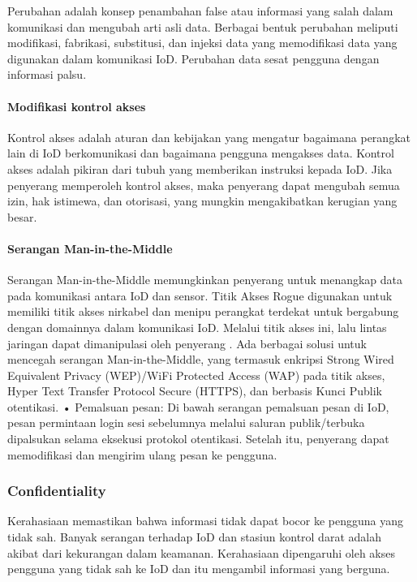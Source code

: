Perubahan adalah konsep penambahan false atau informasi yang salah dalam komunikasi dan mengubah arti asli data. Berbagai bentuk perubahan meliputi modifikasi, fabrikasi, substitusi, dan injeksi data yang memodifikasi data yang digunakan dalam komunikasi IoD. Perubahan data sesat pengguna dengan informasi palsu.

\paragraph{Modifikasi kontrol akses}
\label{par:kontolakses}

Kontrol akses adalah aturan dan kebijakan yang mengatur bagaimana perangkat lain di IoD berkomunikasi dan bagaimana pengguna mengakses data. Kontrol akses adalah pikiran dari tubuh yang memberikan instruksi kepada IoD. Jika penyerang memperoleh kontrol akses, maka penyerang dapat mengubah semua izin, hak istimewa, dan otorisasi, yang mungkin mengakibatkan kerugian yang besar.

\paragraph{Serangan Man-in-the-Middle}
\label{par:mitm}

Serangan Man-in-the-Middle memungkinkan penyerang untuk  menangkap data pada komunikasi antara IoD dan sensor. Titik Akses Rogue digunakan untuk memiliki titik akses nirkabel dan menipu perangkat terdekat untuk bergabung dengan domainnya dalam komunikasi IoD. Melalui titik akses ini, lalu lintas jaringan dapat dimanipulasi oleh penyerang \citep{kamthan2017uavs}. Ada berbagai solusi untuk mencegah serangan Man-in-the-Middle, yang termasuk enkripsi Strong Wired Equivalent Privacy (WEP)/WiFi Protected Access (WAP) pada titik akses, Hyper Text Transfer Protocol Secure (HTTPS), dan berbasis Kunci Publik otentikasi. • Pemalsuan pesan: Di bawah serangan pemalsuan pesan di IoD, pesan permintaan login sesi sebelumnya melalui saluran publik/terbuka dipalsukan selama eksekusi protokol otentikasi. Setelah itu, penyerang dapat memodifikasi dan mengirim ulang pesan ke pengguna.

\subsubsection{Confidentiality}
\label{subsubsec:confidentiality}

Kerahasiaan memastikan bahwa informasi tidak dapat bocor ke pengguna yang tidak sah. Banyak serangan terhadap IoD dan stasiun kontrol darat adalah akibat dari kekurangan dalam keamanan. Kerahasiaan dipengaruhi oleh akses pengguna yang tidak sah ke IoD dan itu mengambil informasi yang berguna.

